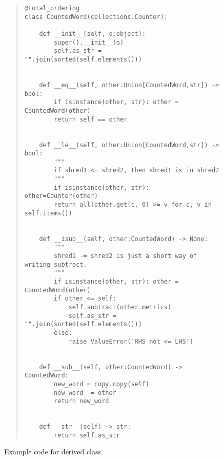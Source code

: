 \documentclass[letterpaper, 11pt]{article}
\begin{document}
\begin{figure}
\begin{framed}
\begin{quote}
\footnotesize
\begin{verbatim}
@total_ordering
class CountedWord(collections.Counter):

    def __init__(self, o:object):
        super().__init__(o)
        self.as_str = "".join(sorted(self.elements()))


    def __eq__(self, other:Union[CountedWord,str]) -> bool:
        if isinstance(other, str): other = CountedWord(other)
        return self == other


    def __le__(self, other:Union[CountedWord,str]) -> bool:
        """
        if shred1 <= shred2, then shred1 is in shred2
        """
        if isinstance(other, str): other=Counter(other)
        return all(other.get(c, 0) >= v for c, v in self.items())


    def __isub__(self, other:CountedWord) -> None:
        """
        shred1 -= shred2 is just a short way of writing subtract.
        """
        if isinstance(other, str): other = CountedWord(other)
        if other <= self:
            self.subtract(other.metrics)
            self.as_str = "".join(sorted(self.elements()))
        else:
            raise ValueError('RHS not <= LHS')


    def __sub__(self, other:CountedWord) -> CountedWord:
        new_word = copy.copy(self)
        new_word -= other
        return new_word


    def __str__(self) -> str:
        return self.as_str
\end{verbatim}
\end{quote}
\end{framed}
\normalsize
\caption{Example code for derived  class}
\label{fig:countermods}
\end{figure}
\end{document}
